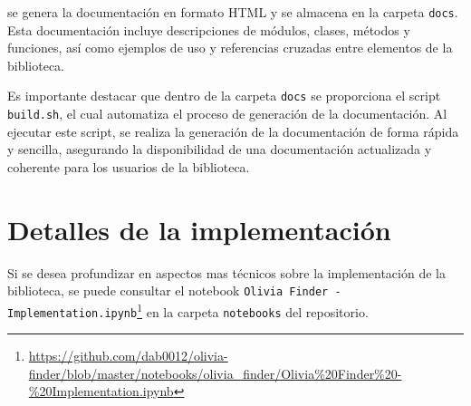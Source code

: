 se genera la documentación en formato HTML y se almacena en la 
carpeta \texttt{docs}. Esta documentación incluye descripciones de módulos, clases, métodos y funciones,
 así como ejemplos de uso y referencias cruzadas entre elementos de la biblioteca.

Es importante destacar que dentro de la carpeta \texttt{docs} se proporciona el script \texttt{build.sh}, 
el cual automatiza el proceso de generación de la documentación. Al ejecutar este script, se realiza la 
generación de la documentación de forma rápida y sencilla, asegurando la disponibilidad de una documentación 
actualizada y coherente para los usuarios de la biblioteca.


\section{Detalles de la implementación}

Si se desea profundizar en aspectos mas técnicos sobre la implementación de la biblioteca, se puede consultar 
el notebook \texttt{Olivia Finder - Implementation.ipynb}\footnote{\url{https://github.com/dab0012/olivia-finder/blob/master/notebooks/olivia_finder/Olivia\%20Finder\%20-\%20Implementation.ipynb}}
 en la carpeta \texttt{notebooks} del repositorio.
